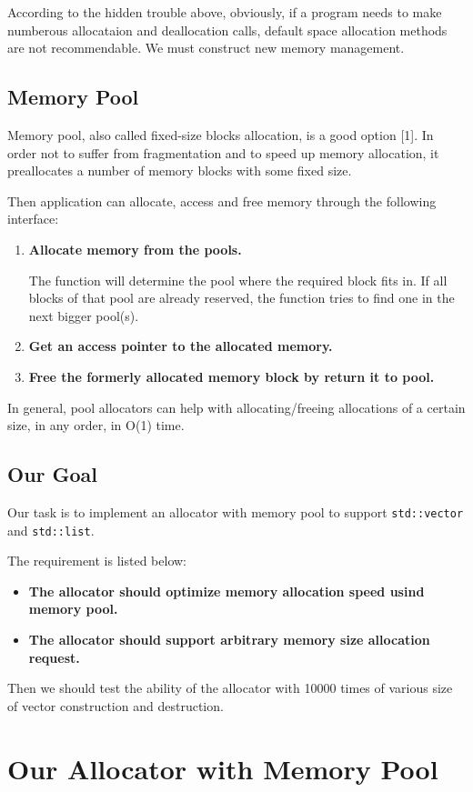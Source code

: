 \documentclass{article}
\begin{document}
According to the hidden trouble above, obviously, if a program needs to make numberous allocataion and deallocation calls, default space allocation methods are not recommendable. We must construct new memory management.
\subsection{Memory Pool}
Memory pool, also called fixed-size blocks allocation, is a good option [1]. In order not to suffer from fragmentation and to speed up memory allocation, it preallocates a number of memory blocks with some fixed size. 

Then application can allocate, access and free memory through the following interface:

\begin{enumerate}
	\item \textbf{Allocate memory from the pools. }
	
	The function will determine the pool where the required block fits in. If all blocks of that pool are already reserved, the function tries to find one in the next bigger pool(s).
	\item \textbf{Get an access pointer to the allocated memory.}
	\item \textbf{Free the formerly allocated memory block by return it to pool.}
\end{enumerate}

In general, pool allocators can help with allocating/freeing allocations of a certain size, in any order, in O(1) time.

\subsection{Our Goal}
Our task is to implement an allocator with memory pool to support \texttt{std::vector} and \texttt{std::list}.

The requirement is listed below:
\begin{itemize}
	\item \textbf{The allocator should optimize memory allocation speed usind memory pool.}
	\item \textbf{The allocator should support arbitrary memory size allocation request.}
\end{itemize}

Then we should test the ability of the allocator with 10000 times of various size of vector construction and destruction.

\section{Our Allocator with Memory Pool}
\end{document}
